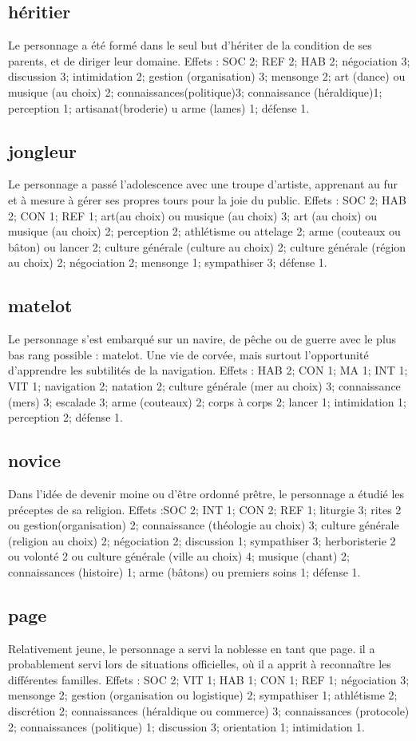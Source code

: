 \documentclass[10pt,a4paper,twocolumn]{book}
\begin{document}
\subsection*{héritier}
Le personnage a été formé dans le seul but d’hériter de la condition de ses parents, et de diriger leur domaine.
Effets : SOC 2; REF 2; HAB 2; négociation 3; discussion 3; intimidation 2; gestion (organisation) 3; mensonge 2; art (dance) ou musique (au choix) 2; connaissances(politique)3; connaissance (héraldique)1; perception 1; artisanat(broderie) u arme (lames) 1; défense 1.
\subsection*{jongleur}
Le personnage a passé l’adolescence avec une troupe d’artiste, apprenant au fur et à mesure à gérer ses propres tours pour la joie du public.
Effets : SOC 2; HAB 2; CON 1; REF 1; art(au choix) ou musique (au choix) 3; art (au choix) ou musique (au choix) 2; perception 2; athlétisme ou attelage 2; arme (couteaux ou bâton) ou lancer 2; culture générale (culture au choix) 2; culture générale (région au choix) 2; négociation 2; mensonge 1; sympathiser 3; défense 1.
\subsection*{matelot}
Le personnage s’est embarqué sur un navire, de pêche ou de guerre avec le plus bas rang possible : matelot. Une vie de corvée, mais surtout l’opportunité d’apprendre les subtilités de la navigation.
Effets : HAB 2; CON 1; MA 1; INT 1; VIT 1; navigation 2; natation 2; culture générale (mer au choix) 3; connaissance (mers) 3; escalade 3; arme (couteaux) 2; corps à corps 2; lancer 1; intimidation 1; perception 2; défense 1.
\subsection*{novice}
Dans l’idée de devenir moine ou d’être ordonné prêtre, le personnage a étudié les préceptes de sa religion.
Effets :SOC 2; INT 1; CON 2; REF 1; liturgie 3; rites 2 ou gestion(organisation) 2; connaissance (théologie au choix) 3; culture générale (religion au choix) 2; négociation 2; discussion 1; sympathiser 3; herboristerie 2 ou volonté 2 ou culture générale (ville au choix) 4; musique (chant) 2; connaissances (histoire) 1; arme (bâtons) ou premiers soins 1; défense 1. 
\subsection*{page}
Relativement jeune, le personnage a servi la noblesse en tant que page. il a probablement servi lors de situations officielles, où il a apprit à reconnaître les différentes familles.
Effets : SOC 2; VIT 1; HAB 1; CON 1; REF 1; négociation 3; mensonge 2; gestion (organisation ou logistique) 2; sympathiser 1; athlétisme 2; discrétion 2; connaissances (héraldique ou commerce) 3; connaissances (protocole) 2; connaissances (politique) 1; discussion 3; orientation 1; intimidation 1.
\end{document}
